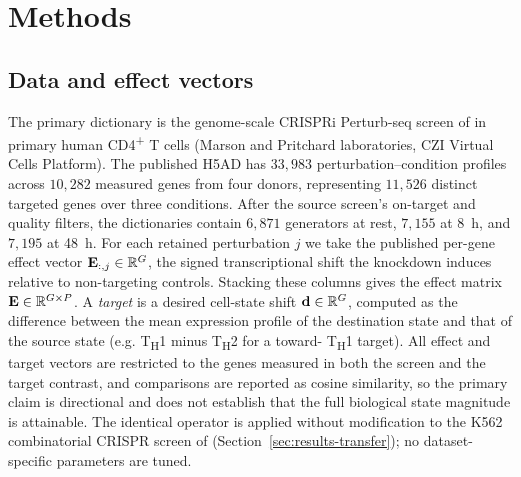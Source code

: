 \section{Methods}
\label{sec:methods}

\subsection{Data and effect vectors}
\label{sec:methods-data}
The primary dictionary is the genome-scale CRISPRi Perturb-seq screen of
\citet{Zhu2025} in primary human CD4\textsuperscript{+} T cells (Marson and Pritchard
laboratories, CZI Virtual Cells Platform). The published H5AD has $33{,}983$
perturbation--condition profiles across $10{,}282$ measured genes from four donors,
representing $11{,}526$ distinct targeted genes over three conditions. After the source
screen's on-target and quality filters, the dictionaries contain $6{,}871$ generators at rest,
$7{,}155$ at 8~h, and $7{,}195$ at 48~h. For each retained perturbation $j$ we take the
published per-gene effect vector $\mathbf{E}_{:,j}\in\mathbb{R}^{G}$,
the signed transcriptional shift the knockdown induces relative to non-targeting controls.
Stacking these columns gives the effect matrix $\mathbf{E}\in\mathbb{R}^{G\times P}$. A
\emph{target} is a desired cell-state shift $\mathbf{d}\in\mathbb{R}^{G}$, computed as the
difference between the mean expression profile of the destination state and that of the
source state (e.g. T\textsubscript{H}1 minus T\textsubscript{H}2 for a toward-
T\textsubscript{H}1 target). All effect and target
vectors are restricted to the genes measured in both the screen and the target contrast, and
comparisons are reported as cosine similarity, so the primary claim is directional and does
not establish that the full biological state magnitude is attainable. The identical operator
is applied without modification to the K562 combinatorial
CRISPR screen of \citet{Norman2019} (Section~\ref{sec:results-transfer}); no
dataset-specific parameters are tuned.

